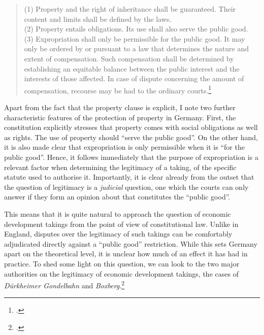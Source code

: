 \begin{quote}
(1) Property and the right of inheritance shall be guaranteed. Their content and limits shall be defined by the laws. \\
(2) Property entails obligations. Its use shall also serve the public good. \\
(3) Expropriation shall only be permissible for the public good. It may only be ordered by or pursuant to a law that determines the nature and extent of compensation. Such compensation shall be determined by establishing an equitable balance between the public interest and the interests of those affected. In case of dispute concerning the amount of compensation, recourse may be had to the ordinary courts.\footcite[14]{basic49}
\end{quote}

Apart from the fact that the property clause is explicit, I note two further characteristic features of the protection of property in Germany. First, the constitution explicitly stresses that property comes with social obligations as well as rights. The use of property should ``serve the public good''. On the other hand, it is also made clear that expropriation is only permissible when it is ``for the public good''. Hence, it follows immediately that the purpose of expropriation is a relevant factor when determining the legitimacy of a taking,  of the specific statute used to authorise it. Importantly, it is clear already from the outset that the question of legitimacy is a \emph{judicial} question, one which the courts can only answer if they form an opinion about that constitutes the ``public good''. 

This means that it is quite natural to approach the question of economic development takings from the point of view of constitutional law. Unlike in England, disputes over the legitimacy of such takings can be comfortably adjudicated directly against a ``public good'' restriction. While this sets Germany apart on the theoretical level, it is unclear how much of an effect it has had in practice. To shed some light on this question, we can look to the two major authorities on the legitimacy of economic development takings, the cases of {\it D\"{u}rkheimer Gondelbahn} and {\it Boxberg}.\footcite{durkheimer81,boxberg86} 

